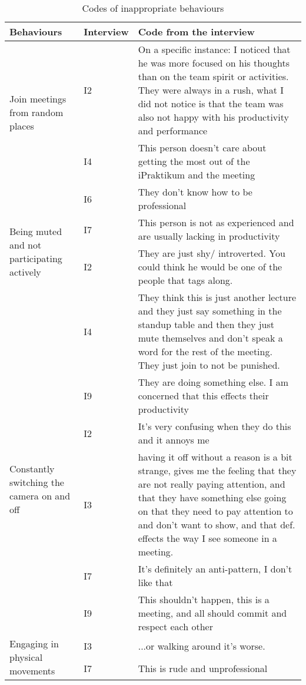 \begin{longtable}[ht]{ p{}   p{}  p{} }
\caption{Codes of inappropriate behaviours}
\label{tab:table5}\\
\hline
\textbf{Behaviours} & \textbf{Interview} & \textbf{Code from the interview} \\
    \hline
    \multirow{2}{4cm}{Join meetings from random places} & I2 & On a specific instance: I noticed that he was more focused on his thoughts than on the team spirit or activities. They were always in a rush, what I did not notice is that the team was also not happy with his productivity and performance \\
    & I4 & This person doesn’t care about getting the most out of the iPraktikum and the meeting  \\
    & I6 & They don’t know how to be professional \\
    \hline
    \multirow{2}{4cm}{Being muted and not participating actively} & I7 & This person is not as experienced and are usually lacking in productivity \\
    & I2 & They are just shy/ introverted. You could think he would be one of the people that tags along. \\
    & I4 & They think this is just another lecture and they just say something in the standup table and then they just mute themselves and don't speak a word for the rest of the meeting. They just join to not be punished.  \\
 	& I9 & They are doing something else. I am concerned that this effects their productivity  \\
    \hline
     \multirow{2}{4cm}{Constantly switching the camera on and off} & I2 & It’s very confusing when they do this and it annoys me \\
    & I3 & having it off without a reason is a bit strange, gives me the feeling that they are not really paying attention, and that they have something else going on that they need to pay attention to and don't want to show, and that def. effects the way I see someone in a meeting.  \\
    & I7 & It’s definitely an anti-pattern, I don’t like that \\
 	& I9 & This shouldn’t happen, this is a meeting, and all should commit and respect each other  \\
    \hline
    \multirow{2}{4cm}{Engaging in physical movements} & I3 & ...or walking around it's worse.\\
    & I7 & This is rude and unprofessional \\

\end{longtable}
